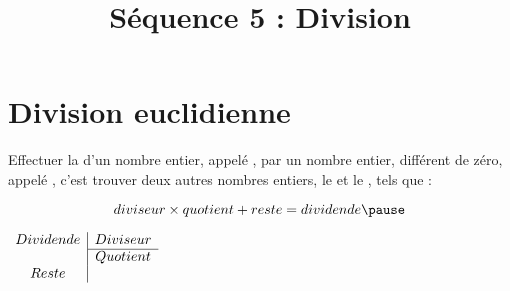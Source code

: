 \documentclass[xcolor={dvipsnames}]{beamer}
\title{Séquence 5 : Division}
\date{ }
\begin{document}
\begin{frame}
  \titlepage 
\end{frame}


\begin{frame}{}
	
\end{frame}

\section{Division euclidienne}

\begin{frame}
	\begin{mydef}
		Effectuer la  d’un nombre entier, appelé \pause  {}, par un nombre entier, différent de zéro, appelé \pause  {}, c’est trouver deux autres nombres entiers, le \pause {} et le , tels que : \pause
		
		\begin{equation*}
			diviseur \times quotient + reste = dividende \pause	
		\end{equation*}
	\end{mydef}

	\begin{center}
		$\begin{array}{c|c}
			Dividende & Diviseur \\
			\cline{2-2}
			& Quotient \\
			Reste & \\
		\end{array}$
	\end{center}

\end{frame}
\end{document}
